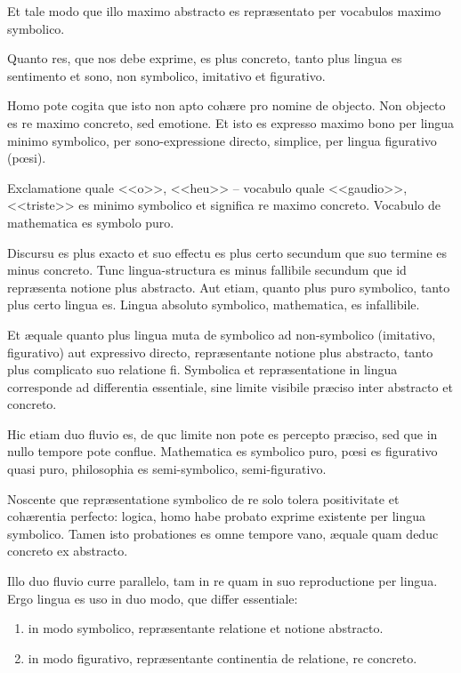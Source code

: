 Et tale modo que illo maximo abstracto es repr\ae{}sentato per vocabulos maximo
symbolico.

Quanto res, que nos debe exprime, es plus concreto, tanto plus lingua es sentimento et
sono, non symbolico, imitativo et figurativo.

Homo pote cogita que isto non apto coh\ae{}re pro nomine de objecto. Non objecto es re
maximo concreto, sed emotione. Et isto es expresso maximo bono per lingua minimo
symbolico, per sono-expressione directo, simplice, per lingua figurativo (p\oe{}si).

Exclamatione quale <<o>>, <<heu>> – vocabulo quale <<gaudio>>, <<triste>> es minimo
symbolico et significa re maximo concreto. Vocabulo de mathematica es symbolo puro.

Discursu es plus exacto et suo effectu es plus certo secundum que suo termine es minus
concreto. Tunc lingua-structura es minus fallibile secundum que id repr\ae{}senta notione
plus abstracto. Aut etiam, quanto plus puro symbolico, tanto plus certo lingua es. Lingua
absoluto symbolico, mathematica, es infallibile.

Et \ae{}quale quanto plus lingua muta de symbolico ad non-symbolico (imitativo,
figurativo) aut expressivo directo, repr\ae{}sentante notione plus abstracto, tanto plus
complicato suo relatione fi. Symbolica et repr\ae{}sentatione in lingua corresponde ad
differentia essentiale, sine limite visibile pr\ae{}ciso inter abstracto et concreto.

Hic etiam duo fluvio es, de quc limite non pote es percepto pr\ae{}ciso, sed que in nullo
tempore pote conflue. Mathematica es symbolico puro, p\oe{}si es figurativo quasi puro,
philosophia es semi-symbolico, semi-figurativo.

Noscente que repr\ae{}sentatione symbolico de re solo tolera positivitate et
coh\ae{}rentia perfecto: logica, homo habe probato exprime existente per lingua
symbolico. Tamen isto probationes es omne tempore vano, \ae{}quale quam deduc concreto ex
abstracto.

Illo duo fluvio curre parallelo, tam in re quam in suo reproductione per lingua. Ergo
lingua es uso in duo modo, que differ essentiale:
\begin{enumerate}
	\item in modo symbolico, repr\ae{}sentante relatione et notione abstracto.
	\item in modo figurativo, repr\ae{}sentante continentia de relatione, re concreto.
\end{enumerate}


